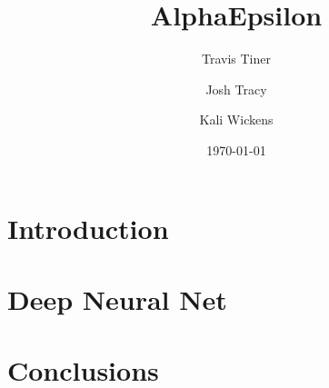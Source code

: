 \documentclass[11pt]{article}
\title{AlphaEpsilon}
\author{Travis Tiner}
\author{Josh Tracy}
\author{Kali Wickens}
\affil{University of Utah -- Deep Learning}
\date{\today}
\begin{document}
\maketitle

\begin{abstract}
	
\end{abstract}

\section{Introduction}

\section{Deep Neural Net}

\section{Conclusions}




%
%
%
%
%
\end{document}
